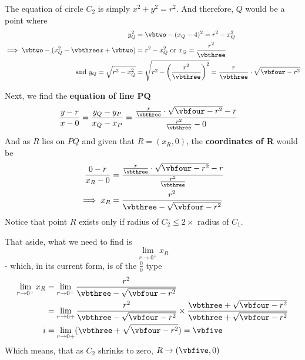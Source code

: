 \begin{solution}
  The equation of circle $C_2$ is simply $x^2 + y^2 = r^2$.
  And therefore, $Q$ would be a point where 
  \begin{align}
    y_Q^2 &= \vbtwo - (x_Q-\vbone)^2 = r^2 - x_Q^2 \\
    \implies \vbtwo - (x_Q^2 - \vbthree x + \vbtwo) &= r^2 - x_Q^2 \text{ or } x_Q = \dfrac{r^2} {\vbthree} \\
    \text{ and }y_Q = \sqrt{r^2 - x_Q^2} &= \sqrt{r^2 - \left( \dfrac{r^2}{\vbthree}\right)^2}
    = \dfrac{r}{\vbthree}\cdot\sqrt{\vbfour - r^2}
  \end{align}
  
  Next, we find the \textbf{equation of line PQ}
  \begin{align}
    \dfrac{y-r}{x-0} &= \dfrac{y_Q-y_P}{x_Q-x_P} = 
    \dfrac{\frac{r}{\vbthree}\cdot\sqrt{\vbfour-r^2}-r}{\frac{r^2}{\vbthree} - 0}
  \end{align}
  And as $R$ lies on $PQ$ and given that $R=(x_R,0)$, the \textbf{coordinates of R} would be 
  \begin{align}
    \dfrac{0-r}{x_R-0} &= \dfrac{\frac{r}{\vbthree}\cdot\sqrt{\vbfour-r^2}-r}{\frac{r^2}{\vbthree}} \\
    \implies x_R &= \dfrac{r^2}{\vbthree - \sqrt{\vbfour - r^2}}
  \end{align}
  Notice that point $R$ exists only if radius of $C_2\leq 2\times$ radius of $C_1$.
  
  That aside, what we need to find is \[ \lim_{r\to 0^+} x_R\] - which, in its current form, 
  is of the $\frac{0}{0}$ type
  \begin{align}
    \lim_{r\to 0^+}x_R &= \lim_{r\to 0^+}\dfrac{r^2}{\vbthree - \sqrt{\vbfour - r^2}} \\
    &= \lim_{r\to 0+}\dfrac{r^2}{\vbthree - \sqrt{\vbfour - r^2}}\times
    \dfrac{\vbthree + \sqrt{\vbfour - r^2}}{\vbthree + \sqrt{\vbfour - r^2}} \\
 i   &= \lim_{r\to 0+}(\vbthree + \sqrt{\vbfour - r^2}) = \vbfive
  \end{align}
  Which means, that as $C_2$ shrinks to zero, $R\to (\vbfive, 0)$
\end{solution}
